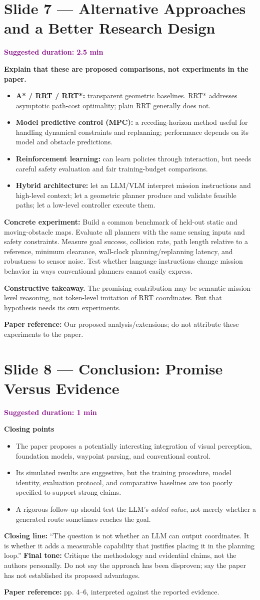 \documentclass[11pt,a4paper]{article}
\newcommand{\slide}[3]{\clearpage\section*{Slide #1 --- #2}\textcolor{purple}{\textbf{Suggested duration: #3}}\par\medskip}
\newcommand{\source}[1]{\par\small\textcolor{deep}{\textbf{Paper reference:} #1}\normalsize}
\begin{document}
\slide{7}{Alternative Approaches and a Better Research Design}{2.5 min}
\textbf{Explain that these are proposed comparisons, not experiments in the paper.}
\begin{itemize}
\item \textbf{A* / RRT / RRT*:} transparent geometric baselines. RRT* addresses asymptotic path-cost optimality; plain RRT generally does not.
\item \textbf{Model predictive control (MPC):} a receding-horizon method useful for handling dynamical constraints and replanning; performance depends on its model and obstacle predictions.
\item \textbf{Reinforcement learning:} can learn policies through interaction, but needs careful safety evaluation and fair training-budget comparisons.
\item \textbf{Hybrid architecture:} let an LLM/VLM interpret mission instructions and high-level context; let a geometric planner produce and validate feasible paths; let a low-level controller execute them.
\end{itemize}
\begin{repair}
\textbf{Concrete experiment:} Build a common benchmark of held-out static and moving-obstacle maps. Evaluate all planners with the same sensing inputs and safety constraints. Measure goal success, collision rate, path length relative to a reference, minimum clearance, wall-clock planning/replanning latency, and robustness to sensor noise. Test whether language instructions change mission behavior in ways conventional planners cannot easily express.
\end{repair}
\textbf{Constructive takeaway.} The promising contribution may be semantic mission-level reasoning, not token-level imitation of RRT coordinates. But that hypothesis needs its own experiments.
\source{Our proposed analysis/extensions; do not attribute these experiments to the paper.}

\slide{8}{Conclusion: Promise Versus Evidence}{1 min}
\textbf{Closing points}
\begin{itemize}
\item The paper proposes a potentially interesting integration of visual perception, foundation models, waypoint parsing, and conventional control.
\item Its simulated results are suggestive, but the training procedure, model identity, evaluation protocol, and comparative baselines are too poorly specified to support strong claims.
\item A rigorous follow-up should test the LLM's \emph{added value}, not merely whether a generated route sometimes reaches the goal.
\end{itemize}
\textbf{Closing line:} ``The question is not whether an LLM can output coordinates. It is whether it adds a measurable capability that justifies placing it in the planning loop.''
\textbf{Final tone:} Critique the methodology and evidential claims, not the authors personally. Do not say the approach has been disproven; say the paper has not established its proposed advantages.
\source{pp. 4--6, interpreted against the reported evidence.}
\end{document}
